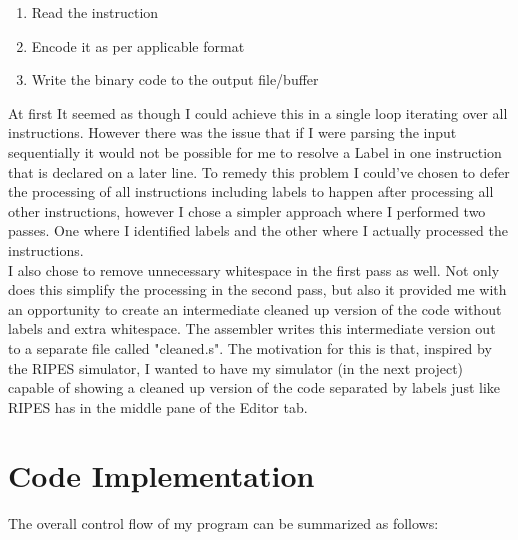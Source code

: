 \documentclass[12pt]{article}
\begin{document}
    \begin{enumerate}
		\item{Read the instruction}
		\item{Encode it as per applicable format}
		\item{Write the binary code to the output file/buffer}
	\end{enumerate}

    At first It seemed as though I could achieve this in a single loop iterating over all instructions. However there was the issue that if I were parsing the input sequentially it would not be possible for me to resolve a Label in one instruction that is declared on a later line. To remedy this problem I could've chosen to defer the processing of all instructions including labels to happen after processing all other instructions, however I chose a simpler approach where I performed two passes. One where I identified labels and the other where I actually processed the instructions.
    \\

    I also chose to remove unnecessary whitespace in the first pass as well. Not only does this simplify the processing in the second pass, but also it provided me with an opportunity to create an intermediate cleaned up version of the code without labels and extra whitespace. The assembler writes this intermediate version out to a separate file called "cleaned.s". The motivation for this is that, inspired by the RIPES simulator, I wanted to have my simulator (in the next project) capable of showing a cleaned up version of the code separated by labels just like RIPES has in the middle pane of the Editor tab.

    \section{Code Implementation}

    The overall control flow of my program can be summarized as follows:
    \\\\
\end{document}
